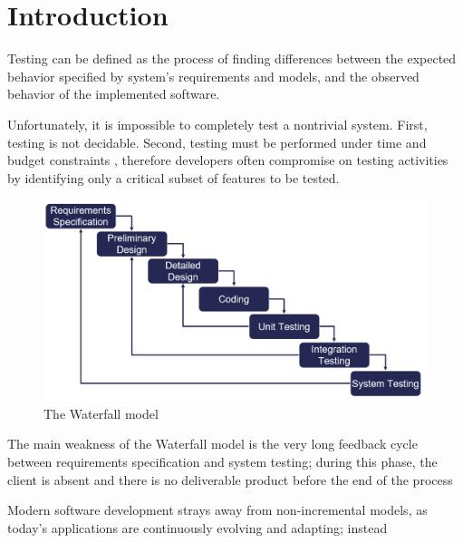 \section{Introduction}
Testing can be defined as the process of finding differences between the expected behavior specified by system's requirements and models, and the observed behavior of the implemented software.

Unfortunately, it is impossible to completely test a nontrivial system. First, testing is not decidable. Second, testing must be performed under time and budget constraints \cite{OOSE}, therefore developers often compromise on testing activities by identifying only a critical subset of features to be tested.

\begin{figure}[h]
    \centering
    \includegraphics[width=\linewidth]{figures/waterfall_model.png}
    \caption{The Waterfall model}
    \label{waterfall_model}
\end{figure}

The main weakness of the Waterfall model is the very long feedback cycle between requirements specification and system testing; during this phase, the client is absent and there is no deliverable product before the end of the process

Modern software development strays away from non-incremental models, as today's applications are continuously evolving and adapting; instead

